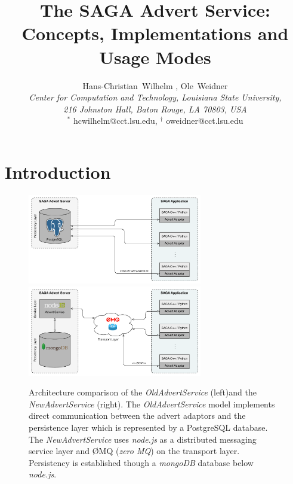 \documentclass[a4paper,10pt,twocolumn]{article}
\newcommand{\oldadvertservice}{\textit{OldAdvertService }}
\newcommand{\newadvertservice}{\textit{NewAdvertService }}
\begin{document}
\thispagestyle{plain}
\title{The SAGA Advert Service: Concepts, Implementations and Usage Modes}
\author{Hans-Christian~Wilhelm \footnotemark, Ole~Weidner\footnotemark \\ {\em \small{Center for Computation and Technology, Louisiana State University,}} \\ {\em {\small 216 Johnston Hall, Baton Rouge, LA 70803, USA}}
\\ {\footnotesize $^*$ hcwilhelm@cct.lsu.edu, $^\dag$ oweidner@cct.lsu.edu}}

\date{}

\maketitle


\begin{abstract}

\end{abstract}

\section{Introduction} 


\begin{figure}[ht]
  \centering
  \includegraphics[width=3.0in]{figures/old_technology_overview} 
  \hspace{3 mm}
  \includegraphics[width=3in]{figures/new_technology_overview}

  \caption[Architecture comparison of the \oldadvertservice and the \newadvertservice]%
  {Architecture comparison of the \oldadvertservice (left)and the \newadvertservice (right). The \oldadvertservice model implements direct communication between the advert adaptors and the persistence layer which is represented by a PostgreSQL database. The \newadvertservice uses \textit{node.js} as a distributed messaging service layer and  \O MQ (\textit{zero MQ}) on the transport layer. Persistency is established though a \textit{mongoDB} database below \textit{node.js}. }
\end{figure}
\end{document}
